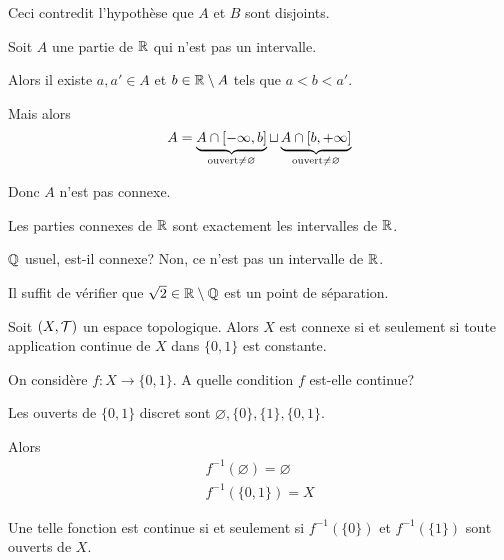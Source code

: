 \documentclass[french,a4paper,10pt]{article}
\begin{document}
\begin{myproof}
		Ceci contredit l'hypothèse que $A$ et $B$ sont disjoints.

		Soit $A$ une partie de $\mathbb{R}$ qui n'est pas un intervalle.

		Alors il existe $a,a'\in A$ et $b\in\mathbb{R}\setminus A$ tels que $a<b<a'$.

		Mais alors
		\[
			A= \underbrace{A\cap\mathopen{[}-\infty,b\mathclose{]}}_{\text{ouvert}\ne\varnothing} \sqcup \underbrace{A\cap\mathopen{[}b,+\infty\mathclose{]}}_{\text{ouvert}\ne\varnothing}
		\]

		Donc $A$ n'est pas connexe.

	\end{myproof}

	\begin{theorem}
		Les parties connexes de $\mathbb{R}$ sont exactement les intervalles de $\mathbb{R}$.
	\end{theorem}

	\begin{exercise}
		$\mathbb{Q}$ usuel, est-il connexe? Non, ce n'est pas un intervalle de $\mathbb{R}$.

		Il suffit de vérifier que $\sqrt{2}\in\mathbb{R}\setminus\mathbb{Q}$ est un point de séparation.
	\end{exercise}

	\begin{theorem}
		Soit $(X,\cal T)$ un espace topologique. Alors $X$ est connexe si et seulement si toute application continue de $X$ dans $\{0,1\}$ est constante.
	\end{theorem}

	\begin{remark}
		On considère $f\colon X\to\{0,1\}$. A quelle condition $f$ est-elle continue?

		Les ouverts de $\{0,1\}$ discret sont $\varnothing, \{0\}, \{1\}, \{0,1\}$.

		Alors 
		\[\begin{gathered}
			f^{-1}(\varnothing) = \varnothing\\
			f^{-1}(\{0,1\}) = X
		\end{gathered}\]

		Une telle fonction est continue si et seulement si $f^{-1}(\{0\})$ et $f^{-1}(\{1\})$ sont ouverts de $X$.
	\end{remark}
\end{document}

